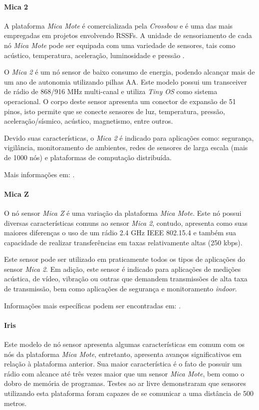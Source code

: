 \paragraph{Mica 2}
A plataforma \emph{Mica Mote} é comercializada pela \emph{Crossbow} e é uma das mais empregadas em projetos envolvendo RSSFs. A unidade de sensoriamento de cada nó \emph{Mica Mote} pode ser equipada com uma variedade de sensores, tais como acústico, temperatura, aceleração, luminosidade e pressão \cite{Ruiz2004}.

O \emph{Mica 2} é um nó sensor de baixo consumo de energia, podendo alcançar mais de um ano de autonomia utilizando pilhas AA. Este modelo possui um transceiver de rádio de 868/916 MHz multi-canal e utiliza \emph{Tiny OS} como sistema operacional.
O corpo deste sensor apresenta um conector de expansão de 51 pinos, isto permite que se conecte sensores de luz, temperatura, pressão, aceleração/sísmico, acústico, magnetismo, entre outros.

Devido suas características, o \emph{Mica 2} é indicado para aplicações como: segurança, vigilância, monitoramento de ambientes, redes de sensores de larga escala (mais de 1000 nós) e plataformas de computação distribuída.

Mais informações em: \cite{Mica2}.

\paragraph{Mica Z}
O nó sensor \emph{Mica Z} é uma variação da plataforma \emph{Mica Mote}. Este nó possui diversas características comuns ao sensor \emph{Mica 2}, contudo, apresenta como suas maiores diferenças o uso de um rádio 2.4 GHz IEEE 802.15.4 e também sua capacidade de realizar transferências em taxas relativamente altas (250 kbps).

Este sensor pode ser utilizado em praticamente todos os tipos de aplicações do sensor \emph{Mica 2}. Em adição, este sensor é indicado para aplicações de medições acústica, de vídeo, vibração ou outras que demandem transmissões de alta taxa de transmissão, bem como aplicações de segurança e monitoramento \emph{indoor}.

Informações mais específicas podem ser encontradas em: \cite{MicaZ}.

\paragraph{Iris}
Este modelo de nó sensor apresenta algumas características em comum com os nós da plataforma \emph{Mica Mote}, entretanto, apresenta avanços significativos em relação à plataforma anterior. Sua maior característica é o fato de possuir um rádio com alcance até três vezes maior que um sensor \emph{Mica Mote}, bem como o dobro de memória de programas.
Testes ao ar livre demonstraram que sensores utilizando esta plataforma foram capazes de se comunicar a uma distância de 500 metros.

